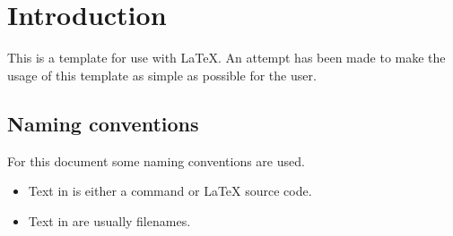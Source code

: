 
\section{Introduction}
\ifUseTsIndex
\fi

This is a template for use with \LaTeX{}. An attempt has been made to make
the usage of this template as simple as possible for the user.

\subsection{Naming conventions}
\ifUseTsIndex
\fi

For this document some naming conventions are used.

\begin{itemize}
    \item Text in  is either a command or
          \LaTeX{} source code.
    \item Text in  are usually filenames.
\end{itemize}
